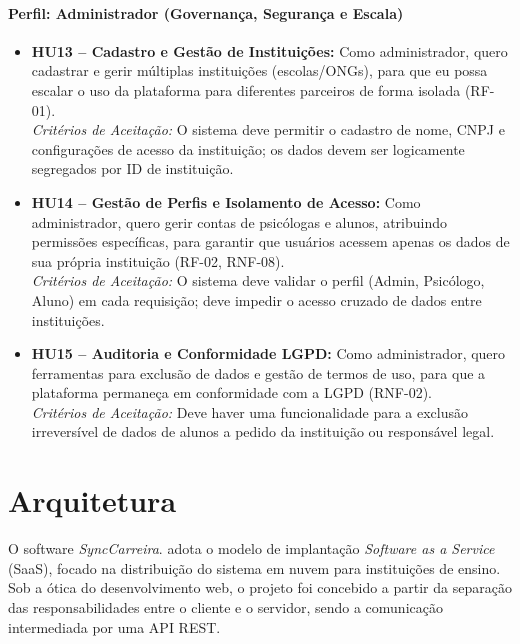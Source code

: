 \paragraph{Perfil: Administrador (Governança, Segurança e Escala)}

\begin{itemize}
    \item \textbf{HU13 -- Cadastro e Gestão de Instituições:} Como administrador, quero cadastrar e gerir múltiplas instituições (escolas/ONGs), para que eu possa escalar o uso da plataforma para diferentes parceiros de forma isolada (RF-01). \\
    \textit{Critérios de Aceitação:} O sistema deve permitir o cadastro de nome, CNPJ e configurações de acesso da instituição; os dados devem ser logicamente segregados por ID de instituição.

    \item \textbf{HU14 -- Gestão de Perfis e Isolamento de Acesso:} Como administrador, quero gerir contas de psicólogas e alunos, atribuindo permissões específicas, para garantir que usuários acessem apenas os dados de sua própria instituição (RF-02, RNF-08). \\
    \textit{Critérios de Aceitação:} O sistema deve validar o perfil (Admin, Psicólogo, Aluno) em cada requisição; deve impedir o acesso cruzado de dados entre instituições.

    \item \textbf{HU15 -- Auditoria e Conformidade LGPD:} Como administrador, quero ferramentas para exclusão de dados e gestão de termos de uso, para que a plataforma permaneça em conformidade com a LGPD (RNF-02). \\
    \textit{Critérios de Aceitação:} Deve haver uma funcionalidade para a exclusão irreversível de dados de alunos a pedido da instituição ou responsável legal.
\end{itemize}

\section{Arquitetura}

O software \textit{SyncCarreira}. adota o modelo de implantação \textit{Software as a Service} (SaaS), focado na distribuição do sistema em nuvem para instituições de ensino. Sob a ótica do desenvolvimento web, o projeto foi concebido a partir da separação das responsabilidades entre o cliente e o servidor, sendo a comunicação intermediada por uma API REST.

